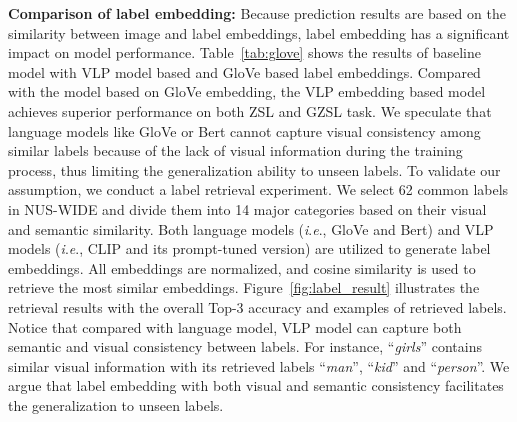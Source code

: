\documentclass[letterpaper]{article} %
\newcommand{\ie}{\textit{i}.\textit{e}.}
\begin{document}
\noindent\textbf{Comparison of label embedding:}
Because prediction results are based on the similarity between image and label embeddings, label embedding has a significant impact on model performance.
Table~\ref{tab:glove} shows the results of baseline model with VLP model based and GloVe based label embeddings.
Compared with the model based on GloVe embedding, the VLP embedding based model achieves superior performance on both ZSL and GZSL task.
We speculate that language models like GloVe or Bert cannot capture visual consistency among similar labels because of the lack of visual information during the training process, thus limiting the generalization ability to unseen labels.
To validate our assumption, we conduct a label retrieval experiment.
We select 62 common labels in NUS-WIDE and divide them into 14 major categories based on their visual and semantic similarity. 
Both language models (\ie, GloVe and Bert) and VLP models (\ie, CLIP and its prompt-tuned version) are utilized to generate label embeddings.
All embeddings are normalized, and cosine similarity is used to retrieve the most similar embeddings.
Figure~\ref{fig:label_result} illustrates the retrieval results with the overall Top-3 accuracy and examples of retrieved labels.
Notice that compared with language model, VLP model can capture both semantic and visual consistency between labels.
For instance, ``\textit{girls}'' contains similar visual information with its retrieved labels ``\textit{man}'', ``\textit{kid}'' and ``\textit{person}''. 
We argue that label embedding with both visual and semantic consistency facilitates the generalization to unseen labels.





\end{document}
